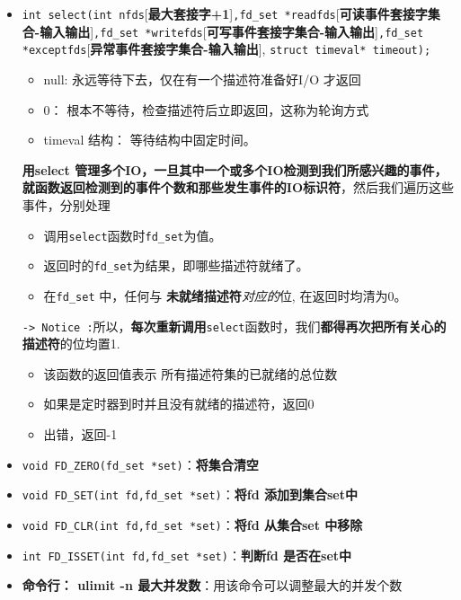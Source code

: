 \documentclass[UTF8,a4paper,8pt]{ctexbook}
\begin{document}
			\begin{itemize}
				\item \verb|int select(int nfds|[\textbf{最大套接字+1}]\verb|,fd_set *readfds|[\textbf{可读事件套接字集合-输入输出}]\verb|,fd_set *writefds|[\textbf{可写事件套接字集合-输入输出}]\verb|,fd_set *exceptfds|[\textbf{异常事件套接字集合-输入输出}], \verb|struct timeval* timeout);|
					
					\begin{itemize}
						\item null: 永远等待下去，仅在有一个描述符准备好I/O 才返回
						\item 0：	根本不等待，检查描述符后立即返回，这称为轮询方式
						\item timeval 结构： 等待结构中固定时间。
					\end{itemize}
					
				\textbf{用select 管理多个IO，一旦其中一个或多个IO检测到我们所感兴趣的事件，就函数返回检测到的事件个数和那些发生事件的IO标识符}，然后我们遍历这些事件，分别处理
				
					\begin{itemize}
						\item 调用\verb|select|函数时\verb|fd_set|为值。
						\item 返回时的\verb|fd_set|为结果，即哪些描述符就绪了。
						\item 在\verb|fd_set| 中，任何与 \textbf{未就绪描述符}\textit{对应的}位, 在返回时均清为0。
					\end{itemize}
					
				\verb|-> Notice :|所以，\textbf{每次重新调用}\verb|select|函数时，我们\textbf{都得再次把所有关心的描述符}的位均置1. 
				
					\begin{itemize}
						\item 该函数的返回值表示 所有描述符集的已就绪的总位数
						\item 如果是定时器到时并且没有就绪的描述符，返回0
						\item 出错，返回-1
					\end{itemize}
				\item \verb|void FD_ZERO(fd_set *set)|：\textbf{将集合清空}
				\item \verb|void FD_SET(int fd,fd_set *set)|：\textbf{将fd 添加到集合set中}
				\item \verb|void FD_CLR(int fd,fd_set *set)|：\textbf{将fd 从集合set 中移除}
				\item \verb|int FD_ISSET(int fd,fd_set *set)|：\textbf{判断fd 是否在set中}
				\item \textbf{命令行： ulimit -n 最大并发数}：用该命令可以调整最大的并发个数
			\end{itemize}
\end{document}
